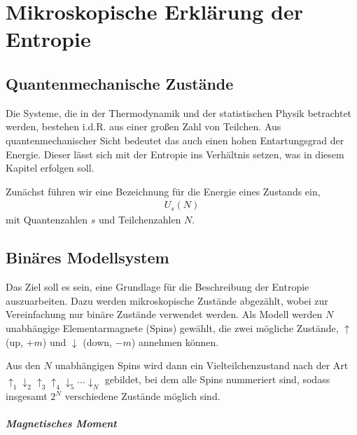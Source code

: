 
\chapter{Mikroskopische Erklärung der Entropie}

\section{Quantenmechanische Zustände}

Die Systeme, die in der Thermodynamik und der statistischen Physik betrachtet werden, bestehen i.d.R. aus einer großen Zahl von Teilchen. Aus quantenmechanischer Sicht bedeutet das auch einen hohen Entartungsgrad der Energie. Dieser lässt sich mit der Entropie ins Verhältnis setzen, was in diesem Kapitel erfolgen soll.

Zunächst führen wir eine Bezeichnung für die Energie eines Zustands ein,
\begin{align*}
    U_s(N)
\end{align*}
mit Quantenzahlen $s$ und Teilchenzahlen $N$.

\section{Binäres Modellsystem}

Das Ziel soll es sein, eine Grundlage für die Beschreibung der Entropie auszuarbeiten. Dazu werden mikroskopische Zustände abgezählt, wobei zur Vereinfachung nur binäre Zustände verwendet werden. Als Modell werden $N$ unabhängige Elementarmagnete (Spins) gewählt, die zwei mögliche Zustände, $\uparrow$ (up, $+m$) und $\downarrow$ (down, $-m$) annehmen können.

Aus den $N$ unabhängigen Spins wird dann ein Vielteilchenzustand nach der Art $\uparrow_1\downarrow_2\uparrow_3\uparrow_4\downarrow_5\dots\downarrow_N$ gebildet, bei dem alle Spins nummeriert sind, sodass insgesamt $2^N$ verschiedene Zustände möglich sind.



\paragraph*{Magnetisches Moment}

